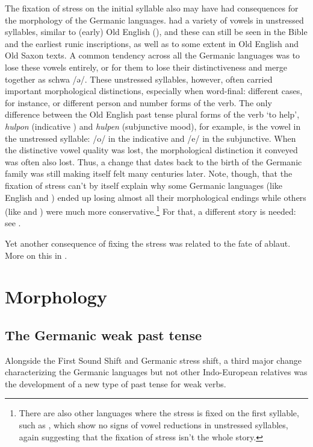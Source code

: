 The fixation of stress on the initial syllable also may have had consequences for the morphology of the Germanic languages.  had a variety of vowels in unstressed syllables, similar to (early) Old English (), and these can still be seen in the  Bible and the earliest runic inscriptions, as well as to some extent in Old English and Old Saxon texts. A common tendency across all the Germanic languages was to lose these vowels entirely, or for them to lose their distinctiveness and merge together as schwa /ə/. These unstressed syllables, however, often carried important morphological distinctions, especially when word-final: different cases, for instance, or different person and number forms of the verb. The only difference between the Old English past tense plural forms of the verb `to help', \emph{hulpon} (indicative ) and \emph{hulpen} (subjunctive mood), for example, is the vowel in the unstressed syllable: /o/ in the indicative and /e/ in the subjunctive. When the distinctive vowel quality was lost, the morphological distinction it conveyed was often also lost. Thus, a change that dates back to the birth of the Germanic family was still making itself felt many centuries later. Note, though, that the fixation of stress can't by itself explain why some Germanic languages (like English and ) ended up losing almost all their morphological endings while others (like  and ) were much more conservative.\footnote{There are also other languages where the stress is fixed on the first syllable, such as , which show no signs of vowel reductions in unstressed syllables, again suggesting that the fixation of stress isn't the whole story.} For that, a different story is needed: see .

Yet another consequence of fixing the stress was related to the fate of ablaut. More on this in .

\section{Morphology}
\subsection{The Germanic weak past tense}\label{prehistory-weakpast}
Alongside the First Sound Shift and Germanic stress shift, a third major change characterizing the Germanic languages but not other Indo-European relatives was the development of a new type of past tense for weak verbs.

